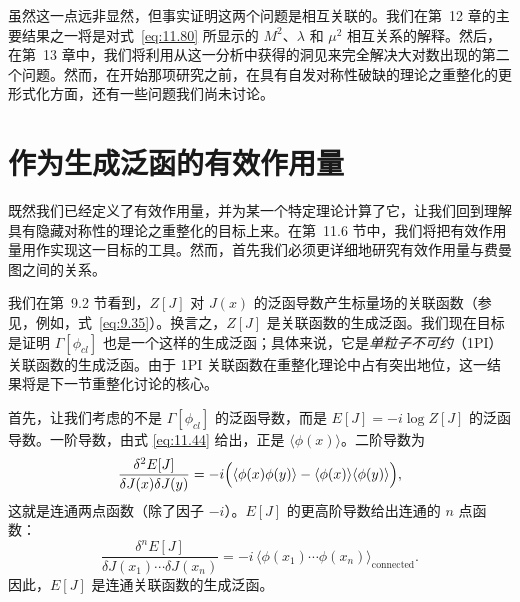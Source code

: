 虽然这一点远非显然，但事实证明这两个问题是相互关联的。我们在第~12 章的主要结果之一将是对式~\eqref{eq:11.80} 所显示的 $M^2$、$\lambda$ 和 $\mu^2$ 相互关系的解释。然后，在第~13 章中，我们将利用从这一分析中获得的洞见来完全解决大对数出现的第二个问题。然而，在开始那项研究之前，在具有自发对称性破缺的理论之重整化的更形式化方面，还有一些问题我们尚未讨论。

\section{作为生成泛函的有效作用量}

既然我们已经定义了有效作用量，并为某一个特定理论计算了它，让我们回到理解具有隐藏对称性的理论之重整化的目标上来。在第~11.6 节中，我们将把有效作用量用作实现这一目标的工具。然而，首先我们必须更详细地研究有效作用量与费曼图之间的关系。

我们在第~9.2 节看到，$Z[J]$ 对 $J(x)$ 的泛函导数产生标量场的关联函数（参见，例如，式~\eqref{eq:9.35}）。换言之，$Z[J]$ 是关联函数的生成泛函。我们现在目标是证明 $\Gamma[\phi_{cl}]$ 也是一个这样的生成泛函；具体来说，它是\emph{单粒子不可约}（1PI）关联函数的生成泛函。由于 1PI 关联函数在重整化理论中占有突出地位，这一结果将是下一节重整化讨论的核心。

首先，让我们考虑的不是 $\Gamma[\phi_{cl}]$ 的泛函导数，而是 $E[J] = -i\log Z[J]$ 的泛函导数。一阶导数，由式 \eqref{eq:11.44} 给出，正是 $\langle\phi(x)\rangle$。二阶导数为
\begin{equation}
  \frac{\delta^2 E[J]}{\delta J(x)\delta J(y)}
  = -i\Bigl( \langle\phi(x)\phi(y)\rangle
    - \langle\phi(x)\rangle\langle\phi(y)\rangle \Bigr) ,
  \label{eq:11.82}
\end{equation}
这就是连通两点函数（除了因子 $-i$）。$E[J]$ 的更高阶导数给出连通的 $n$ 点函数：
\begin{equation}
  \frac{\delta^n E[J]}{\delta J(x_1)\cdots\delta J(x_n)} = -i\,
    \langle\phi(x_1)\cdots\phi(x_n)\rangle_{\mathrm{connected}} .
  \label{eq:11.83}
\end{equation}
因此，$E[J]$ 是连通关联函数的生成泛函。

